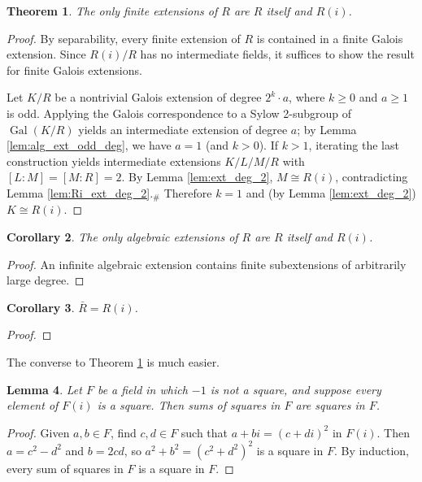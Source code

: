 \documentclass[a4paper]{report}
\newtheorem{theorem}{Theorem}
\newtheorem{lemma}[theorem]{Lemma}
\newtheorem{corollary}[theorem]{Corollary}
\theoremstyle{definition}
\DeclareMathOperator{\Gal}{Gal}
\begin{document}
\begin{theorem}
  \label{thm:FTAlg}
  The only finite extensions of $R$ are $R$ itself and $R(i)$.
\end{theorem}
\begin{proof}
  By separability, every finite extension of $R$ is contained in a finite Galois extension. Since $R(i)/R$ has no intermediate fields, it suffices to show the result for finite Galois extensions.
  
  Let $K/R$ be a nontrivial Galois extension of degree $2^k\cdot a$, where $k\geq 0$ and $a\geq1$ is odd. Applying the Galois correspondence to a Sylow 2-subgroup of $\Gal(K/R)$ yields an intermediate extension of degree $a$; by Lemma \ref{lem:alg_ext_odd_deg}, we have $a=1$ (and $k>0$). If $k>1$, iterating the last construction yields intermediate extensions $K/L/M/R$ with $[L:M]=[M:R]=2$. By Lemma \ref{lem:ext_deg_2}, $M\cong R(i)$, contradicting Lemma \ref{lem:Ri_ext_deg_2}.$_\#$ Therefore $k=1$ and (by Lemma \ref{lem:ext_deg_2}) $K\cong R(i)$.
\end{proof}

\begin{corollary}
  \label{cor:FTAlg_alg}
  The only algebraic extensions of $R$ are $R$ itself and $R(i)$.
\end{corollary}
\begin{proof}
  An infinite algebraic extension contains finite subextensions of arbitrarily large degree.
\end{proof}

\begin{corollary}
  \label{cor:RCF_ac}
  $\bar{R}=R(i)$.
\end{corollary}
\begin{proof}
\end{proof}

The converse to Theorem \ref{thm:FTAlg} is much easier.

\begin{lemma}
  \label{lem:sumsq_is_sq}
  Let $F$ be a field in which $-1$ is not a square, and suppose every element of $F(i)$ is a square. Then sums of squares in $F$ are squares in $F$.
\end{lemma}
\begin{proof}
  Given $a,b\in F$, find $c,d\in F$ such that $a+bi=(c+di)^2$ in $F(i)$. Then $a=c^2-d^2$ and $b=2cd$, so $a^2+b^2=(c^2+d^2)^2$ is a square in $F$. By induction, every sum of squares in $F$ is a square in $F$.
\end{proof}
\end{document}
